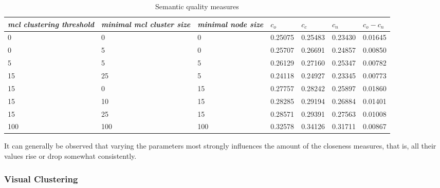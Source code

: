 \begin{table}[h]
    \begin{tabular}{| p{2.2cm} | p{2.2cm} | p{2cm} || p{1.4cm} | p{1.4cm} | p{1.4cm} | p{1.4cm} |}
	\hline    
    \emph{mcl clustering threshold} & \emph{minimal mcl cluster size} 	& \emph{minimal node size} & $c_o $ & $c_c$ & $c_n$ & $c_o - c_n$ \\ \hline
    0 	& 0 	& 0 & 0.25075 & 0.25483 & 0.23430 & 0.01645 \\ \hline
    0 	& 5 	& 0 & 0.25707 & 0.26691 & 0.24857 & 0.00850 \\ \hline
    5 	& 5 	& 5 & 0.26129 & 0.27160 & 0.25347 & 0.00782 \\ \hline     
    15 	& 25 &  5 & 0.24118 & 0.24927 & 0.23345 & 0.00773\\ \hline
    15 	& 0 & 15 & 0.27757 & 0.28242 & 0.25897 & 0.01860 \\ \hline
    15 	& 10 & 15 & 0.28285 & 0.29194 & 0.26884 & 0.01401 \\ \hline
    15 	& 25 & 15 & 0.28571 & 0.29391 & 0.27563 & 0.01008 \\ \hline
    	100 	& 100 & 100 & 0.32578 & 0.34126 & 0.31711 & 0.00867 \\ \hline
    \end{tabular}
    \caption{Semantic quality measures}
	\label{tab_treeevaluation}
\end{table}

It can generally be observed that varying the parameters most strongly influences the amount of the closeness measures, that is, all their values rise or drop somewhat consistently.
 
\subsubsection*{Visual Clustering}


